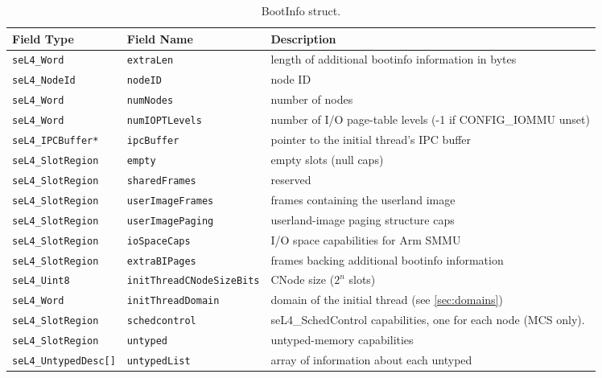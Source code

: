 \begin{table}[htb]
  \begin{center}
    \caption{BootInfo struct.}
    \label{tab:bootinfo_struct}
    \begin{tabularx}{\textwidth}{llX}
      \toprule
      Field Type & Field Name & Description \\
      \midrule
      \texttt{seL4\_Word}           & \texttt{extraLen}                & length of additional bootinfo information in bytes \\
      \texttt{seL4\_NodeId}         & \texttt{nodeID}                  & node ID \\
      \texttt{seL4\_Word}           & \texttt{numNodes}                & number of nodes \\
      \texttt{seL4\_Word}           & \texttt{numIOPTLevels}           & number of I/O page-table levels (-1 if CONFIG\_IOMMU unset) \\
      \texttt{seL4\_IPCBuffer*}     & \texttt{ipcBuffer}               & pointer to the initial thread's IPC buffer \\
      \texttt{seL4\_SlotRegion}     & \texttt{empty}                   & empty slots (null caps) \\
      \texttt{seL4\_SlotRegion}     & \texttt{sharedFrames}            & reserved \\
      \texttt{seL4\_SlotRegion}     & \texttt{userImageFrames}         & frames containing the userland image \\
      \texttt{seL4\_SlotRegion}     & \texttt{userImagePaging}         & userland-image paging structure caps \\
      \texttt{seL4\_SlotRegion}     & \texttt{ioSpaceCaps}             & I/O space capabilities for Arm SMMU \\
      \texttt{seL4\_SlotRegion}     & \texttt{extraBIPages}            & frames backing additional bootinfo information \\
      \texttt{seL4\_Uint8}          & \texttt{initThreadCNodeSizeBits} & CNode size ($2^n$ slots) \\
      \texttt{seL4\_Word}           & \texttt{initThreadDomain}        & domain of the initial thread (see \autoref{sec:domains}) \\
      \texttt{seL4\_SlotRegion}     & \texttt{schedcontrol}            & seL4\_SchedControl capabilities, one for each node (MCS only). \\
      \texttt{seL4\_SlotRegion}     & \texttt{untyped}                 & untyped-memory capabilities \\
      \texttt{seL4\_UntypedDesc[]}  & \texttt{untypedList}             & array of information about each untyped \\
      \bottomrule
    \end{tabularx}
  \end{center}
\end{table}

